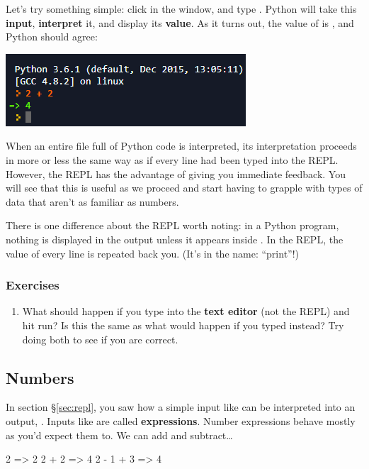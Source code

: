 \documentclass{article}
\let\oldref\ref
\renewcommand\ref{\S\oldref}
\newcommand\pyi\pythoninline
\newcounter{exercisei}
\newenvironment{exercises}{
\subsubsection*{Exercises}
\begin{enumerate} 
\setcounter{enumi}{\value{exercisei}}
}{
\setcounter{exercisei}{\value{enumi}}
\end{enumerate}
\clearpage
}
\begin{document}
Let's try something simple: click in the window, and type \pyi{2 + 2}. Python will take this \textbf{input}, \textbf{interpret} it, and display its \textbf{value}. As it turns out, the value of \pyi{2 + 2} is \pyi{4}, and Python should agree: 

\begin{center}
\includegraphics[scale=0.7]{2plus2.png}
\end{center}

When an entire file full of Python code is interpreted, its interpretation proceeds in more or less the same way as if every line had been typed into the REPL. However, the REPL has the advantage of giving you immediate feedback. You will see that this is useful as we proceed and start having to grapple with types of data that aren't as familiar as numbers.

There is one difference about the REPL worth noting: in a Python program, nothing is displayed in the output unless it appears inside \pyi{print}. In the REPL, the value of every line is repeated back you. (It's in the name: ``print''!)

\begin{exercises}
\item What should happen if you type \pyi{2 + 2} into the {\bf text editor} (not the REPL) and hit run? Is this the same as what would happen if you typed \pyi{print(2 + 2)} instead? Try doing both to see if you are correct. \\
\end{exercises}


\subsection{Numbers}
\label{sec:expressions}

In section \ref{sec:repl}, you saw how a simple input like \pyi{2 + 2} can be interpreted into an output, \pyi{4}. Inputs like \pyi{2 + 2} are called \textbf{expressions}. Number expressions behave mostly as you'd expect them to. We can add and subtract\ldots

\begin{python}
2
=> 2
2 + 2 
=> 4
2 - 1 + 3
=> 4
\end{python}
\end{document}
